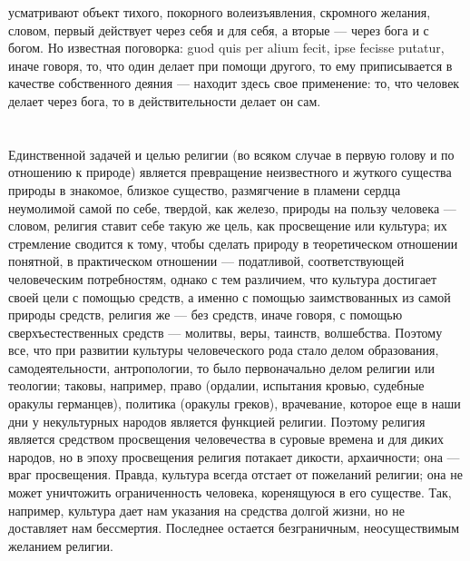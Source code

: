\documentclass[12pt]{article}
\begin{document}
усматривают объект тихого, покорного волеизъявления, скромного желания, словом, первый действует через себя и для себя, а вторые --- через бога и с богом. Но известная поговорка: guod quis per alium fecit, ipse fecisse putatur, иначе говоря, то, что один делает при помощи другого, то ему приписывается в качестве собственного деяния --- находит здесь свое применение: то, что человек делает через бога, то в действительности делает он сам.


\section{}

Единственной задачей и целью религии (во всяком случае в первую голову и по отношению к природе) является превращение неизвестного и жуткого существа природы в знакомое, близкое существо, размягчение в пламени сердца неумолимой самой по себе, твердой, как железо, природы на пользу человека --- словом, религия ставит себе такую же цель, как просвещение или культура; их стремление сводится к тому, чтобы сделать природу в теоретическом отношении понятной, в практическом отношении --- податливой, соответствующей человеческим потребностям, однако с тем различием, что культура достигает своей цели с помощью средств, а именно с помощью заимствованных из самой природы средств, религия же --- без средств, иначе говоря, с помощью сверхъестественных средств --- молитвы, веры, таинств, волшебства. Поэтому все, что при развитии культуры человеческого рода стало делом образования, самодеятельности, антропологии, то было первоначально делом религии или теологии; таковы, например, право (ордалии, испытания кровью, судебные оракулы германцев), политика (оракулы греков), врачевание, которое еще в наши дни у некультурных народов является функцией религии. Поэтому религия является средством просвещения человечества в суровые времена и для диких народов, но в эпоху просвещения религия потакает дикости, архаичности; она --- враг просвещения. Правда, культура всегда отстает от пожеланий религии; она не может уничтожить ограниченность человека, коренящуюся в его существе. Так, например, культура дает нам указания на средства долгой жизни, но не доставляет нам бессмертия. Последнее остается безграничным, неосуществимым желанием религии.


\section{}
\end{document}
